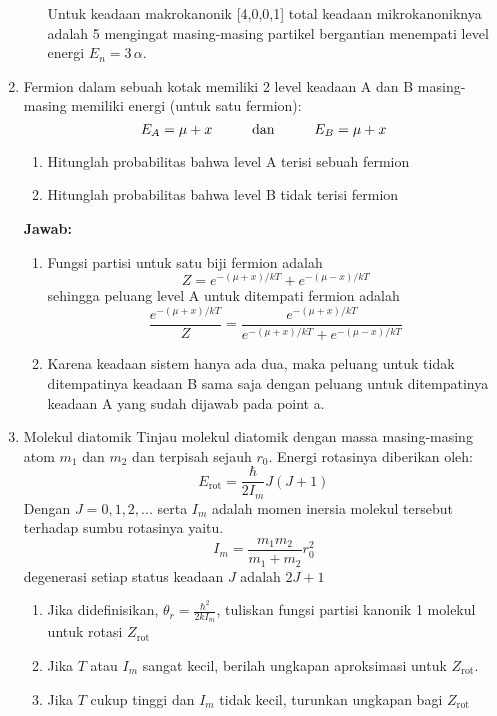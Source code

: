 \documentclass[a4paper , 12 pt]{article}
\begin{document}
\begin{enumerate}
\begin{enumerate}
Untuk keadaan makrokanonik [4,0,0,1] total keadaan mikrokanoniknya adalah 5 mengingat masing-masing partikel bergantian menempati level energi $E_n = 3 \, \alpha$.
\end{enumerate}
\item Fermion dalam sebuah kotak memiliki 2 level keadaan A dan B masing-masing memiliki energi (untuk satu fermion):
\[
E_A = \mu + x  \hspace{1 cm} \text{dan} \hspace{1 cm } E_B = \mu + x 
\]
\begin{enumerate}
\item Hitunglah probabilitas bahwa level A terisi sebuah fermion 
\item Hitunglah probabilitas bahwa level B tidak terisi fermion
\end{enumerate}
\textbf{Jawab:}
\begin{enumerate}
\item Fungsi partisi untuk satu biji fermion adalah
\[
Z = e^{-(\mu + x)/kT} + e^{-(\mu - x)/kT}
\]
sehingga peluang level A untuk ditempati fermion adalah
\[
\frac{e^{-(\mu + x)/ kT}}{Z} = \frac{e^{-(\mu + x)/ kT}}{e^{-(\mu + x)/kT} + e^{-(\mu - x)/kT}}
\]
\item Karena keadaan sistem hanya ada dua, maka peluang untuk tidak ditempatinya keadaan B sama saja dengan peluang untuk ditempatinya keadaan A yang sudah dijawab pada point a.
\end{enumerate}
\item Molekul diatomik \newline
Tinjau molekul diatomik dengan massa masing-masing atom $m_1$ dan $m_2$  dan terpisah sejauh $r_0$. Energi rotasinya diberikan oleh:
\[
E_\mathrm{rot} = \frac{\hbar}{2 I_m} J(J+1)
\]
Dengan $J = 0,1,2, ... $ serta $I_m$ adalah momen inersia molekul tersebut terhadap sumbu rotasinya yaitu. 
\[
I_m = \frac{m_1 m_2}{m_1 + m_2} r_0^2
\]
degenerasi setiap status keadaan $J$ adalah $2J + 1$ 
\begin{enumerate}
\item Jika didefinisikan, $\theta_r = \displaystyle \frac{\hbar^2}{2 k I_m}$, tuliskan fungsi partisi kanonik 1 molekul untuk rotasi $Z_\mathrm{rot}$ 
\item  Jika $T$ atau $I_m $ sangat kecil, berilah ungkapan aproksimasi untuk $Z_\mathrm{rot}$.
\item Jika $T$ cukup tinggi dan $I_m$ tidak kecil, turunkan ungkapan bagi $Z_\mathrm{rot}$
\end{enumerate}

\end{enumerate}
\end{document}
